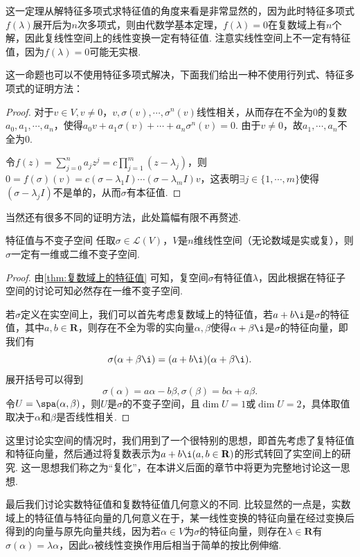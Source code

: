 这一定理从解特征多项式求特征值的角度来看是非常显然的，因为此时特征多项式$f(\lambda)$展开后为$n$次多项式，则由代数学基本定理，$f(\lambda)=0$在复数域上有$n$个解，因此复线性空间上的线性变换一定有特征值. 注意实线性空间上不一定有特征值，因为$f(\lambda)=0$可能无实根.

这一命题也可以不使用特征多项式解决，下面我们给出一种不使用行列式、特征多项式的证明方法：
\begin{proof}
    对于$v \in V,v \neq 0$，$v,\sigma(v),\cdots,\sigma^n(v)$线性相关，从而存在不全为$0$的复数$a_0,a_1,\cdots,a_n$，使得$a_0v+a_1\sigma(v)+\cdots+a_n\sigma^n(v)=0$. 由于$v \neq 0$，故$a_1,\cdots,a_n$不全为$0$.

    令$f(z)=\displaystyle\sum_{j=0}^{n}a_jz^j=c\displaystyle\prod_{j=1}^{m}(z-\lambda_j)$，则$0=f(\sigma)(v)=c(\sigma-\lambda_1I)\cdots(\sigma-\lambda_mI)v$，这表明$\exists j\in \{1,\cdots,m\}$使得$(\sigma-\lambda_jI)$不是单的，从而$\sigma$有本征值.
\end{proof}
当然还有很多不同的证明方法，此处篇幅有限不再赘述.

\begin{theorem}{}{特征值与不变子空间}
    任取$\sigma\in \mathcal{L}(V)$，$V$是$n$维线性空间（无论数域是实或复），则$\sigma$一定有一维或二维不变子空间.
\end{theorem}

\begin{proof}
    由\autoref{thm:复数域上的特征值} 可知，复空间$\sigma$有特征值$\lambda$，因此根据在特征子空间的讨论可知必然存在一维不变子空间.

    若$\sigma$定义在实空间上，我们可以首先考虑复数域上的特征值，若$a+b\i$是$\sigma$的特征值，其中$a,b\in\mathbf{R}$，则存在不全为零的实向量$\alpha,\beta$使得$\alpha+\beta\i$是$\sigma$的特征向量，即我们有
    \[\sigma(\alpha+\beta\i)=(a+b\i)(\alpha+\beta\i).\]
    展开括号可以得到
    \[\sigma(\alpha)=a\alpha-b\beta,\sigma(\beta)=b\alpha+a\beta.\]
    令$U=\spa(\alpha,\beta)$，则$U$是$\sigma$的不变子空间，且$\dim U=1$或$\dim U=2$，具体取值取决于$\alpha$和$\beta$是否线性相关.
\end{proof}

这里讨论实空间的情况时，我们用到了一个很特别的思想，即首先考虑了复特征值和特征向量，然后通过将复数表示为$a+b\i(a,b\in\mathbf{R})$的形式转回了实空间上的研究. 这一思想我们称之为``复化''，在本讲义后面的章节中将更为完整地讨论这一思想.

最后我们讨论实数特征值和复数特征值几何意义的不同. 比较显然的一点是，实数域上的特征值与特征向量的几何意义在于，某一线性变换的特征向量在经过变换后得到的向量与原先向量共线，因为若$\alpha\in V$为$\sigma$的特征向量，则存在$\lambda\in\mathbf{R}$有$\sigma(\alpha)=\lambda\alpha$，因此$\alpha$被线性变换作用后相当于简单的按比例伸缩.

